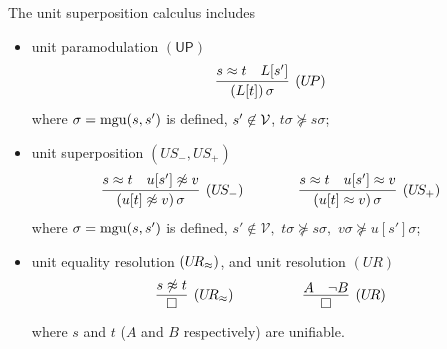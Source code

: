 
\begin{definition}\label{def:unit-superpositin-calculus}
	The {\myem unit superposition calculus} includes
	\begin{itemize}
		\item unit paramodulation $\mathsf{(UP)}$
		\begin{gather*}
		\infer
		[(U\!P)]
		{(L[t])\,\sigma}
		{s\mEQ t&L[s']}
		\end{gather*}
		where $\sigma=\operatorname{mgu}(s,s')$ is defined,
		$s'\not\in{\mathcal V}$,
		$t\sigma\not\succcurlyeq s\sigma$;
		\item unit superposition $(U\!S_-,U\!S_+)$
		\begin{gather*}
		\infer
		[(U\!S_-)]
		{(u[t]\mNE v)\,\sigma}
		{s\mEQ t&u[s']\mNE v}
		\qquad\qquad
		\infer
		[(U\!S_+)]
		{(u[t]\mEQ v)\,\sigma}
		{s\mEQ t&u[s']\mEQ v}
		\end{gather*}
		where $\sigma=\operatorname{mgu}(s,s')$ is defined,
		$s'\not\in\mathcal{V},$
		$t\sigma\not\succcurlyeq s\sigma,$
		$v\sigma\not\succcurlyeq u[s']\sigma$;
		\item unit equality resolution $(U\!R_\approx)$, and unit resolution $(U\!R)$
		\begin{gather*}
		\infer
		[(U\!R_\mEQ)]
		{\emptyclause}
		{s\mNE t}
		\quad\quad\quad\qquad
		\infer
		[(U\!R)]
		{\emptyclause}
		{A&\lnot B}
		\end{gather*}
		where $s$ and $t$ ($A$ and $B$ respectively) are unifiable.
	\end{itemize}
\end{definition}
